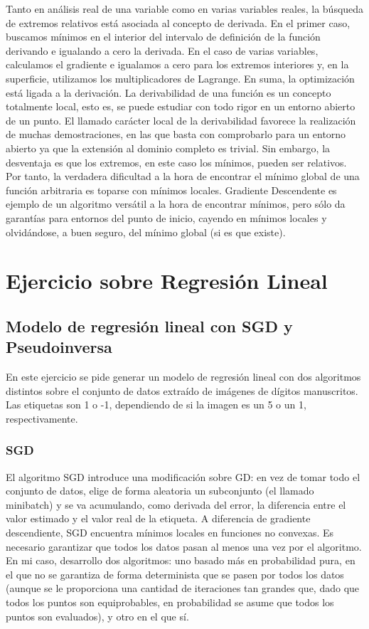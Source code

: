 Tanto en análisis real de una variable como en varias variables reales, la búsqueda de extremos relativos está asociada al concepto de derivada. En el primer caso, buscamos mínimos en el interior del intervalo de definición de la función derivando e igualando a cero la derivada. En el caso de varias variables, calculamos el gradiente e igualamos a cero para los extremos interiores y, en la superficie, utilizamos los multiplicadores de Lagrange. En suma, la optimización está ligada a la derivación. La derivabilidad de una función es un concepto totalmente local, esto es, se puede estudiar con todo rigor en un entorno abierto de un punto. El llamado carácter local de la derivabilidad favorece la realización de muchas demostraciones, en las que basta con comprobarlo para un entorno abierto ya que la extensión al dominio completo es trivial. Sin embargo, la desventaja es que los extremos, en este caso los mínimos, pueden ser relativos. Por tanto, la verdadera dificultad a la hora de encontrar el mínimo global de una función arbitraria es toparse con mínimos locales. Gradiente Descendente es ejemplo de un algoritmo versátil a la hora de encontrar mínimos, pero sólo da garantías para entornos del punto de inicio, cayendo en mínimos locales y olvidándose, a buen seguro, del mínimo global (si es que existe).

\section{Ejercicio sobre Regresión Lineal}

\subsection{Modelo de regresión lineal con SGD y Pseudoinversa}

En este ejercicio se pide generar un modelo de regresión lineal con dos algoritmos distintos sobre el conjunto de datos extraído de imágenes de dígitos manuscritos. Las etiquetas son 1 o -1, dependiendo de si la imagen es un 5 o un 1, respectivamente.

\subsubsection{SGD}

El algoritmo SGD introduce una modificación sobre GD: en vez de tomar todo el conjunto de datos, elige de forma aleatoria un subconjunto (el llamado minibatch) y se va acumulando, como derivada del error, la diferencia entre el valor estimado y el valor real de la etiqueta. A diferencia de gradiente descendiente, SGD encuentra mínimos locales en funciones no convexas. Es necesario garantizar que todos los datos pasan al menos una vez por el algoritmo. En mi caso, desarrollo dos algoritmos: uno basado más en probabilidad pura, en el que no se garantiza de forma determinista que se pasen por todos los datos (aunque se le proporciona una cantidad de iteraciones tan grandes que, dado que todos los puntos son equiprobables, en probabilidad se asume que todos los puntos son evaluados), y otro en el que sí.\\

